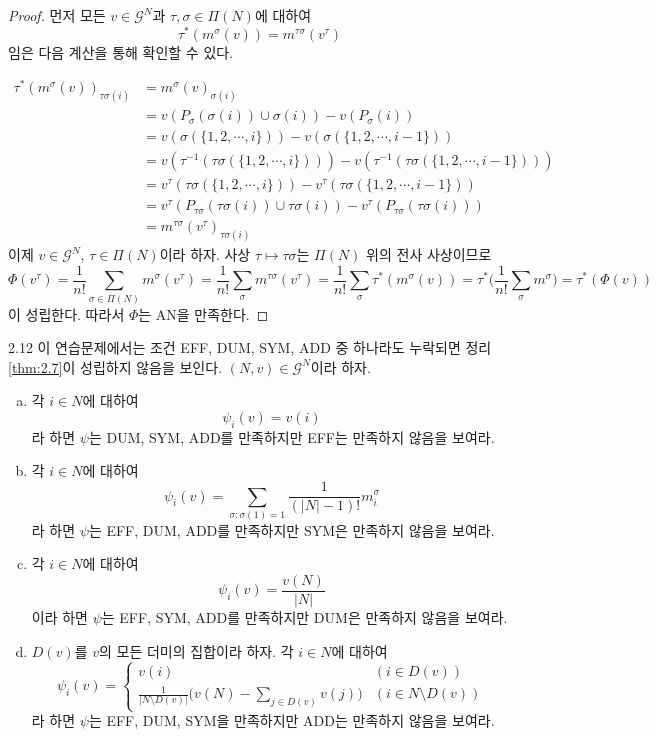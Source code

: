 \documentclass{article}
\numberwithin{equation}{section}
\begin{document}
\begin{proof}
	먼저 모든 $v\in\mathcal G^N$과 $\tau,\sigma\in\Pi(N)$에 대하여
	\[
		\tau^*(m^\sigma(v))=m^{\tau\sigma}(v^\tau)
	\]
	임은 다음 계산을 통해 확인할 수 있다.
	
	\[
		\begin{aligned}
			\tau^*(m^\sigma(v))_{\tau\sigma(i)}&=m^\sigma(v)_{\sigma(i)}\\
			&=v(P_\sigma(\sigma(i))\cup\sigma(i))-v(P_\sigma(i))\\
			&=v(\sigma(\{1,2,\cdots,i\}))-v(\sigma(\{1,2,\cdots,i-1\}))\\
			&=v(\tau^{-1}(\tau\sigma(\{1,2,\cdots,i\})))-v(\tau^{-1}(\tau\sigma(\{1,2,\cdots,i-1\})))\\
			&=v^\tau(\tau\sigma(\{1,2,\cdots,i\}))-v^\tau(\tau\sigma(\{1,2,\cdots,i-1\}))\\
			&=v^\tau(P_{\tau\sigma}(\tau\sigma(i))\cup\tau\sigma(i))-v^\tau(P_{\tau\sigma}(\tau\sigma(i)))\\
			&=m^{\tau\sigma}(v^\tau)_{\tau\sigma(i)}
		\end{aligned}
	\]
	이제 $v\in\mathcal G^N$, $\tau\in\Pi(N)$이라 하자. 사상 $\tau\mapsto\tau\sigma$는 $\Pi(N)$ 위의 전사 사상이므로
	\[
		\Phi(v^\tau)=\frac{1}{n!}\sum_{\sigma\in\Pi(N)}m^\sigma(v^\tau)=\frac{1}{n!}\sum_{\sigma}m^{\tau\sigma}(v^\tau)=\frac{1}{n!}\sum_\sigma\tau^*(m^\sigma(v))=\tau^*\biggl(\frac{1}{n!}\sum_\sigma m^\sigma\biggr)=\tau^*(\Phi(v))
	\]
	이 성립한다. 따라서 $\Phi$는 AN을 만족한다.
\end{proof}

\begin{prob}{}{2.12}
	이 연습문제에서는 조건 EFF, DUM, SYM, ADD 중 하나라도 누락되면 정리 \ref{thm:2.7}이 성립하지 않음을 보인다. $(N,v)\in\mathcal G^N$이라 하자.
	\begin{enumerate}[(a)]
		\item 각 $i\in N$에 대하여
			\[
				\psi_i(v)=v(i)
			\]
			라 하면 $\psi$는 DUM, SYM, ADD를 만족하지만 EFF는 만족하지 않음을 보여라.
		\item 각 $i\in N$에 대하여 
			\[
				\psi_i(v)=\sum_{\sigma:\sigma(1)=1}\frac{1}{(\vert N\vert-1)!}m^\sigma_i
			\]
			라 하면 $\psi$는 EFF, DUM, ADD를 만족하지만 SYM은 만족하지 않음을 보여라.
		\item 각 $i\in N$에 대하여
			\[
				\psi_i(v)=\frac{v(N)}{\vert N\vert}
			\]
			이라 하면 $\psi$는 EFF, SYM, ADD를 만족하지만 DUM은 만족하지 않음을 보여라.
		\item $D(v)$를 $v$의 모든 더미의 집합이라 하자. 각 $i\in N$에 대하여
			\[
				\psi_i(v)=\begin{cases}
					v(i) & (i\in D(v))\\[3pt]
					\displaystyle\frac{1}{\vert N\setminus D(v)\vert}\biggl(v(N)-\sum_{j\in D(v)}v(j)\biggr) & (i\in N\setminus D(v))
				\end{cases}
			\]
			라 하면 $\psi$는 EFF, DUM, SYM을 만족하지만 ADD는 만족하지 않음을 보여라.
	\end{enumerate}
\end{prob}
\end{document}
